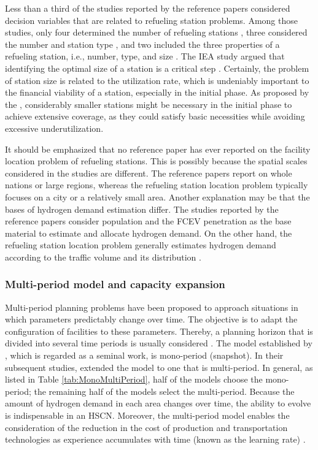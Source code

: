 \documentclass[11pt,3p]{elsarticle}
\begin{document}
Less than a third of the studies reported by the reference papers considered decision variables that are related to refueling station problems. Among those studies, only four determined the number of refueling stations \citep{almansoori2012design,almaraz2014hydrogen,almaraz2015deployment,nunes2015design}, three considered the number and station type \citep{kim2017integrated,konda2011optimal,moreno2017towards}, and two included the three properties of a refueling station, i.e., number, type, and size \citep{agnolucci2013importance,woo2016optimization}. The IEA study argued that identifying the optimal size of a station is a critical step \citep{iea2015technology}. Certainly, the problem of station size is related to the utilization rate, which is undeniably important to the financial viability of a station, especially in the initial phase. As proposed by the \citet{iea2015technology}, considerably smaller stations might be necessary in the initial phase to achieve extensive coverage, as they could satisfy basic necessities while avoiding excessive underutilization. 

It should be emphasized that no reference paper has ever reported on the facility location problem of refueling stations. This is possibly because the spatial scales considered in the studies are different. The reference papers report on whole nations or large regions, whereas the refueling station location problem typically focuses on a city or a relatively small area. Another explanation may be that the bases of hydrogen demand estimation differ. The studies reported by the reference papers consider population and the FCEV penetration as the base material to estimate and allocate hydrogen demand. On the other hand, the refueling station location problem generally estimates hydrogen demand according to the traffic volume and its distribution \citep{kuby2009optimization,Vries2017incorporating}.

\subsubsection{Multi-period model and capacity expansion}

Multi-period planning problems have been proposed to approach situations in which parameters predictably change over time. The objective is to adapt the configuration of facilities to these parameters. Thereby, a planning horizon that is divided into several time periods is usually considered \citep{melo2009facility}. The model established by \citet{almansoori2006design}, which is regarded as a seminal work, is mono-period (snapshot). In their subsequent studies, \citet{almansoori2009design,almansoori2012design} extended the model to one that is multi-period. In general, as listed in Table \ref{tab:MonoMultiPeriod}, half of the models choose the mono-period; the remaining half of the models select the multi-period. Because the amount of hydrogen demand in each area changes over time, the ability to evolve is indispensable in an HSCN. Moreover, the multi-period model enables the consideration of the reduction in the cost of production and transportation technologies as experience accumulates with time (known as the learning rate) \citep{almansoori2012design,brey2006designing}.
\end{document}
